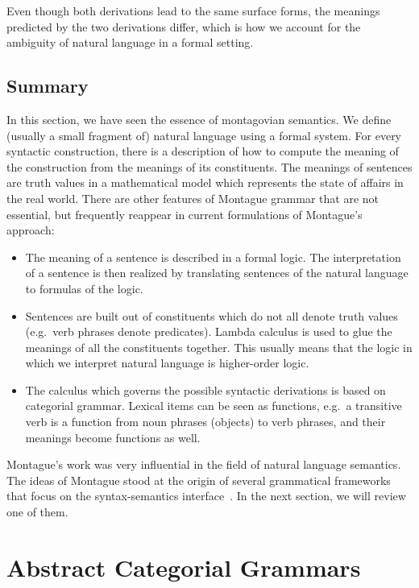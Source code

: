 Even though both derivations lead to the same surface forms, the meanings
predicted by the two derivations differ, which is how we account for the
ambiguity of natural language in a formal setting.

\subsection{Summary}
\label{ssec:montague-summary}

In this section, we have seen the essence of montagovian semantics. We
define (usually a small fragment of) natural language using a formal
system. For every syntactic construction, there is a description of how to
compute the meaning of the construction from the meanings of its
constituents. The meanings of sentences are truth values in a mathematical
model which represents the state of affairs in the real world. There are
other features of Montague grammar that are not essential, but frequently
reappear in current formulations of Montague's approach:

\begin{itemize}
\item The meaning of a sentence is described in a formal logic. The
  interpretation of a sentence is then realized by translating sentences of
  the natural language to formulas of the logic.
\item Sentences are built out of constituents which do not all denote
  truth values (e.g.\ verb phrases denote predicates). Lambda calculus is
  used to glue the meanings of all the constituents together. This usually
  means that the logic in which we interpret natural language is
  higher-order logic.
\item The calculus which governs the possible syntactic derivations is
  based on categorial grammar. Lexical items can be seen as functions,
  e.g.\ a transitive verb is a function from noun phrases (objects) to verb
  phrases, and their meanings become functions as well.
\end{itemize}

Montague's work was very influential in the field of natural language
semantics. The ideas of Montague stood at the origin of several grammatical
frameworks that focus on the syntax-semantics
interface~\cite{de2001towards,muskens2001lambda,pollard2008convergent,martin2014dynamic}.
In the next section, we will review one of them.


\section{Abstract Categorial Grammars}
\label{sec:acg}

